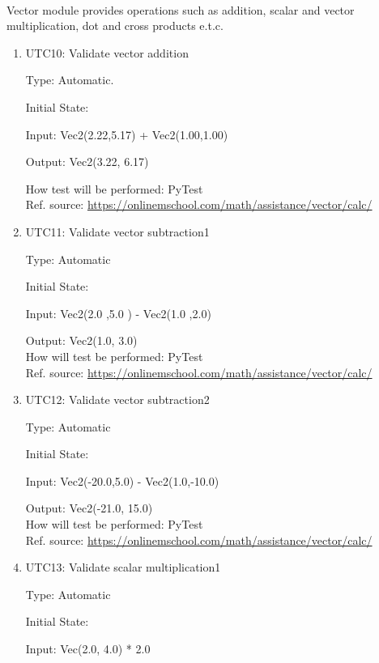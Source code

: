 \documentclass[12pt, titlepage]{article}
\begin{document}
\paragraph{}
Vector module provides operations such as addition, scalar and vector multiplication, dot and cross products e.t.c.
\begin{enumerate}
	
	\item{UTC10}{: Validate vector addition \\}
	
	Type: Automatic.
	
	Initial State: 
	
	Input: Vec2(2.22,5.17) + Vec2(1.00,1.00)
	
	Output: Vec2(3.22, 6.17)
	
	How test will be performed: PyTest \\
	Ref. source: \url{https://onlinemschool.com/math/assistance/vector/calc/}
	
	\item{UTC11}{: Validate vector subtraction1\\}
	
	Type: Automatic
	
	Initial State: 
	
	Input: Vec2(2.0 ,5.0 ) - Vec2(1.0 ,2.0)
	
	Output: Vec2(1.0, 3.0)\\
	How will test be performed: PyTest\\
	Ref. source: \url{https://onlinemschool.com/math/assistance/vector/calc/}
	
	\item{UTC12}{: Validate vector subtraction2\\}
	
	Type: Automatic
	
	Initial State: 
	
	Input: Vec2(-20.0,5.0) - Vec2(1.0,-10.0)
	
	Output: Vec2(-21.0, 15.0)\\
	How will test be performed: PyTest\\
	Ref. source: \url{https://onlinemschool.com/math/assistance/vector/calc/}
	
	\item{UTC13}{: Validate scalar multiplication1\\}
	
	Type: Automatic
	
	Initial State: 
	
	Input: Vec(2.0, 4.0) * 2.0
	

\end{enumerate}
\end{document}
